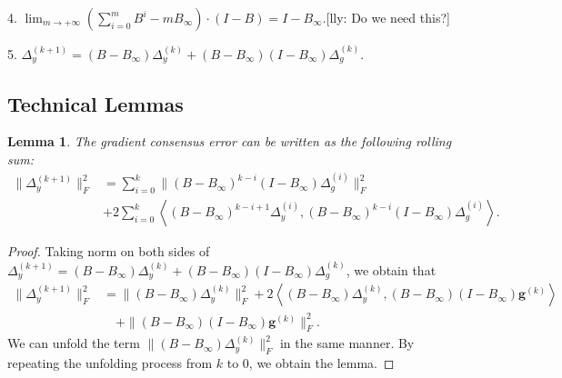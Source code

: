 \documentclass{article}
\newtheorem{lemma}[thm]{Lemma}
\newcommand{\vg}{{\mathbf{g}}}
\newcommand{\norm}[1]{\| #1 \|}
\newcommand{\ip}[1]{\left\langle#1\right\rangle}
\newcommand{\lly}[1]{{\color{red}[lly: #1]}}
\begin{document}
4. $\lim_{m\to+\infty}(\sum_{i=0}^mB^i-mB_{\infty})\cdot (I-B)=I-B_{\infty}$.\lly{Do we need this?} \label{eq:basic_transformation_4}

5. $\Delta_{y}^{(k+1)}=(B-B_{\infty})\Delta_{y}^{(k)}+(B-B_{\infty})(I-B_{\infty})\Delta_{g}^{(k)}$. \label{eq:basic_transformation_5}

\subsection{Technical Lemmas}
\begin{lemma}\label{lemma: gradient consensus decomposition}
The gradient consensus error can be written as the following rolling sum:
\begin{align*}
\norm{\Delta_y^{(k+1)}}_F^2&=\sum_{i=0}^k \norm{(B-B_{\infty})^{k-i}(I-B_{\infty})\Delta_g^{(i)}}_F^2\\
&+2\sum_{i=0}^k \ip{(B-B_{\infty})^{k-i+1}\Delta_y^{(i)}, (B-B_{\infty})^{k-i}(I-B_{\infty})\Delta_g^{(i)}}.
\end{align*}
\end{lemma}
\begin{proof}
  Taking norm on both sides of $\Delta_{y}^{(k+1)}=(B-B_{\infty})\Delta_{y}^{(k)}+(B-B_{\infty})(I-B_{\infty})\Delta_{g}^{(k)}$, we obtain that 
  \begin{align*}
      \norm{\Delta_y^{(k+1)}}_F^2&=\norm{(B-B_\infty)\Delta_y^{(k)}}_F^2+2\ip{(B-B_\infty)\Delta_y^{(k)},(B-B_\infty)(I-B_\infty)\vg^{(k)}}\nonumber \\
      &\quad +\norm{(B-B_\infty)(I-B_\infty)\vg^{(k)}}_F^2.
  \end{align*}
  We can unfold the term $\norm{(B-B_\infty)\Delta_y^{(k)}}_F^2$ in the same manner. By repeating the unfolding process from $k$ to $0$, we obtain the lemma.
\end{proof}
\end{document}
